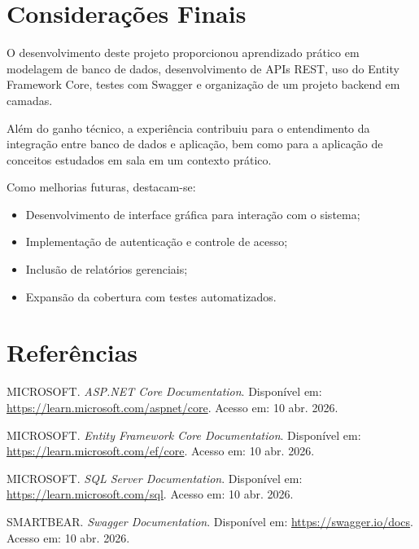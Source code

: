 \documentclass[12pt]{article}
\begin{document}
\section{Considerações Finais}

O desenvolvimento deste projeto proporcionou aprendizado prático em modelagem de banco de dados, desenvolvimento de APIs REST, uso do Entity Framework Core, testes com Swagger e organização de um projeto backend em camadas.

Além do ganho técnico, a experiência contribuiu para o entendimento da integração entre banco de dados e aplicação, bem como para a aplicação de conceitos estudados em sala em um contexto prático.

Como melhorias futuras, destacam-se:

\begin{itemize}
\item Desenvolvimento de interface gráfica para interação com o sistema;
\item Implementação de autenticação e controle de acesso;
\item Inclusão de relatórios gerenciais;
\item Expansão da cobertura com testes automatizados.
\end{itemize}

\section{Referências}

\begin{flushleft}

MICROSOFT. \textit{ASP.NET Core Documentation}. Disponível em: 
\url{https://learn.microsoft.com/aspnet/core}. Acesso em: 10 abr. 2026.

MICROSOFT. \textit{Entity Framework Core Documentation}. Disponível em: 
\url{https://learn.microsoft.com/ef/core}. Acesso em: 10 abr. 2026.

MICROSOFT. \textit{SQL Server Documentation}. Disponível em: 
\url{https://learn.microsoft.com/sql}. Acesso em: 10 abr. 2026.

SMARTBEAR. \textit{Swagger Documentation}. Disponível em: 
\url{https://swagger.io/docs}. Acesso em: 10 abr. 2026.

\end{flushleft}
\end{document}
